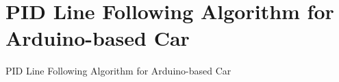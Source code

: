\chapter{PID Line Following Algorithm for Arduino-\/based Car}
\hypertarget{md__d_1_2_computer_2_arduino_2line_match_2car2_2_p_i_d-_line-_following-_algorithm-for-_arduino-based-_car_2_r_e_a_d_m_e}{}\label{md__d_1_2_computer_2_arduino_2line_match_2car2_2_p_i_d-_line-_following-_algorithm-for-_arduino-based-_car_2_r_e_a_d_m_e}
\label{md__d_1_2_computer_2_arduino_2line_match_2car2_2_p_i_d-_line-_following-_algorithm-for-_arduino-based-_car_2_r_e_a_d_m_e_autotoc_md0}%
%
 PID Line Following Algorithm for Arduino-\/based Car 